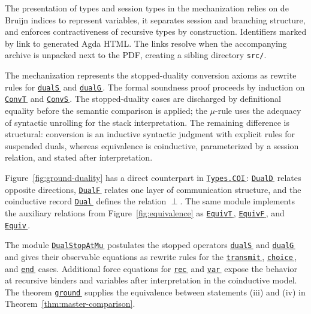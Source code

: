 \documentclass[submission,copyright,creativecommons]{eptcs}
\newcommand{\Agda}{Agda}
\newcommand{\AgdaHen}{}
\newcommand{\AgdaLink}[2]{\href{src/#1}{\mbox{\texttt{#2}\,\AgdaHen}}}
\newcommand{\AgdaFile}[2]{\AgdaLink{#1.html}{#2}}
\newcommand{\AgdaName}[3]{\AgdaLink{#1.html\##2}{#3}}
\newcommand{\CoDual}{\mathrel{\perp}}
\begin{document}
The presentation of types and session types in the mechanization relies on de
Bruijn indices to represent variables, it separates session and branching
structure, and enforces contractiveness of recursive types by construction.
Identifiers marked by \AgdaHen{} link to generated \Agda{} HTML.  The links
resolve when the accompanying archive is unpacked next to the PDF, creating a
sibling directory \texttt{src/}.

The mechanization represents the stopped-duality conversion axioms as rewrite
rules \cite{cockx:LIPIcs.TYPES.2019.2,10.1145/3434341} for \AgdaName{DualStopAtMu}{dualS}{dualS} and
\AgdaName{DualStopAtMu}{dualG}{dualG}.  The formal soundness proof proceeds by
induction on \AgdaName{Conversion}{ConvT}{ConvT} and
\AgdaName{Conversion}{ConvS}{ConvS}.  The stopped-duality cases are discharged
by definitional equality before the semantic comparison is applied; the
$\mu$-rule uses the adequacy of syntactic unrolling for the stack
interpretation.  The remaining difference is structural: conversion is an
inductive syntactic judgment with explicit rules for suspended duals, whereas
equivalence is coinductive, parameterized by a session relation, and stated
after interpretation.


Figure~\ref{fig:ground-duality} has a direct counterpart in
\AgdaFile{Types.COI}{Types.COI}: \AgdaName{Types.COI}{DualD}{DualD} relates
opposite directions, \AgdaName{Types.COI}{DualF}{DualF} relates one layer of
communication structure, and the coinductive record
\AgdaName{Types.COI}{Dual}{Dual} defines the relation $\CoDual$.  The same
module implements the auxiliary relations from Figure~\ref{fig:equivalence}
as \AgdaName{Types.COI}{EquivT}{EquivT},
\AgdaName{Types.COI}{EquivF}{EquivF}, and
\AgdaName{Types.COI}{Equiv}{Equiv}.

The module \AgdaFile{DualStopAtMu}{DualStopAtMu} postulates the stopped
operators \AgdaName{DualStopAtMu}{dualS}{dualS} and
\AgdaName{DualStopAtMu}{dualG}{dualG} and gives their observable equations as
rewrite rules for the \AgdaName{DualStopAtMu}{dual-transmit}{transmit},
\AgdaName{DualStopAtMu}{dual-choice}{choice}, and
\AgdaName{DualStopAtMu}{dual-end}{end} cases.  Additional force equations for
\AgdaName{DualStopAtMu}{dual-rec-force}{rec} and
\AgdaName{DualStopAtMu}{dual-var-force}{var} expose the behavior at recursive
binders and variables after interpretation in the coinductive model.
The theorem \AgdaName{DualStopAtMu}{ground}{ground} supplies the equivalence
between statements (iii) and (iv) in Theorem~\ref{thm:master-comparison}.
\end{document}
